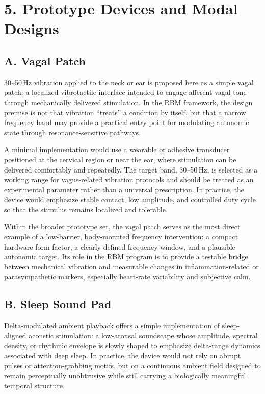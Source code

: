 \documentclass[11pt]{article}
\begin{document}
\section{5. Prototype Devices and Modal Designs}

\subsection{A. Vagal Patch}

30--50\,Hz vibration applied to the neck or ear is proposed here as a simple vagal patch: a localized vibrotactile interface intended to engage afferent vagal tone through mechanically delivered stimulation. In the RBM framework, the design premise is not that vibration ``treats'' a condition by itself, but that a narrow frequency band may provide a practical entry point for modulating autonomic state through resonance-sensitive pathways.

A minimal implementation would use a wearable or adhesive transducer positioned at the cervical region or near the ear, where stimulation can be delivered comfortably and repeatedly. The target band, 30--50\,Hz, is selected as a working range for vagus-related vibration protocols and should be treated as an experimental parameter rather than a universal prescription. In practice, the device would emphasize stable contact, low amplitude, and controlled duty cycle so that the stimulus remains localized and tolerable.

Within the broader prototype set, the vagal patch serves as the most direct example of a low-barrier, body-mounted frequency intervention: a compact hardware form factor, a clearly defined frequency window, and a plausible autonomic target. Its role in the RBM program is to provide a testable bridge between mechanical vibration and measurable changes in inflammation-related or parasympathetic markers, especially heart-rate variability and subjective calm.


\subsection{B. Sleep Sound Pad}

Delta-modulated ambient playback offers a simple implementation of sleep-aligned acoustic stimulation: a low-arousal soundscape whose amplitude, spectral density, or rhythmic envelope is slowly shaped to emphasize delta-range dynamics associated with deep sleep. In practice, the device would not rely on abrupt pulses or attention-grabbing motifs, but on a continuous ambient field designed to remain perceptually unobtrusive while still carrying a biologically meaningful temporal structure.
\end{document}
